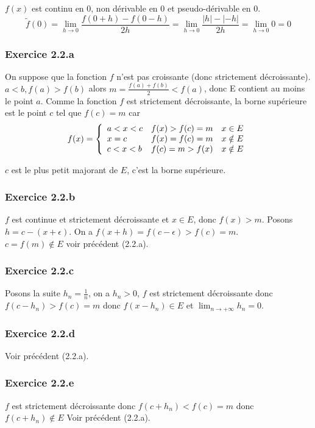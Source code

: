 \documentclass[]{book}
\theoremstyle{definition}
\begin{document}
$f(x)$ est continu en 0, non d\'erivable en 0 et pseudo-d\'erivable en 0.
$$\tilde{f}(0)= \lim_{h \to 0} \frac{f(0+h)-f(0-h)}{2h} = \lim_{h \to 0} \frac{|h|-|-h|}{2h} = \lim_{h \to 0} 0 = 0$$


\subsubsection*{Exercice 2.2.a}

On suppose que la fonction $f$ n'est pas croissante (donc strictement d\'ecroissante). 
$a<b, f(a) > f(b)$ alors $m = \frac{f(a)+f(b)}{2} < f(a)$, donc E contient au moins le point $a$. Comme la fonction $f$ est strictement d\'ecroissante, la borne sup\'erieure est le point $c$ tel que $f(c) = m$ car 
$$
f(x) = \left\{ 
\begin{array}{l l l}
a < x < c & f(x) > f(c) = m & x \in E \\
x = c & f(x) = f(c) = m & x \notin E \\
c < x < b & f(c) = m > f(x) & x \notin E \\
\end{array}
\right.
$$

$c$ est le plus petit majorant de $E$, c'est la borne sup\'erieure.

\subsubsection*{Exercice 2.2.b}
$f$ est continue et strictement d\'ecroissante et $x \in E$, donc $f(x) > m$. Posons $h = c-(x+\epsilon)$. On a $f(x+h) = f(c-\epsilon) > f(c) = m$. \\

$c = f(m) \notin E$ voir pr\'ec\'edent (2.2.a).

\subsubsection*{Exercice 2.2.c}
Posons la suite $h_n = \frac{1}{n}$, on a $h_n > 0$, $f$ est strictement d\'ecroissante donc $f(c-h_n) > f(c) = m$ donc $f(x-h_n) \in E$ et $\lim_{n \to +\infty} h_n = 0$.

\subsubsection*{Exercice 2.2.d}
Voir pr\'ec\'edent (2.2.a).

\subsubsection*{Exercice 2.2.e}
$f$ est strictement d\'ecroissante donc $f(c+h_n) < f(c) = m$ donc $f(c+h_n) \notin E$
Voir pr\'ec\'edent (2.2.a).
\end{document}

